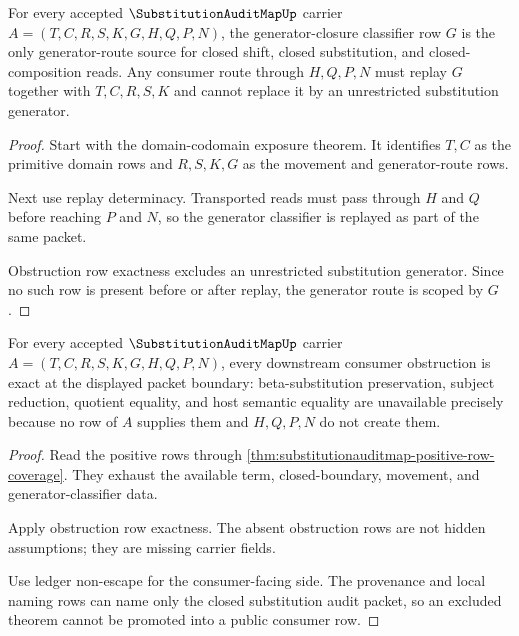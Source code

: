 \begin{theorem}
\label{thm:substitutionauditmap-generator-route-scope}
For every accepted $\SubstitutionAuditMapUp$ carrier $A=(T,C,R,S,K,G,H,Q,P,N)$, the generator-closure classifier row $G$ is the only generator-route source for closed shift, closed substitution, and closed-composition reads. Any consumer route through $H,Q,P,N$ must replay $G$ together with $T,C,R,S,K$ and cannot replace it by an unrestricted substitution generator.
\end{theorem}
\begin{proof}
Start with the domain-codomain exposure theorem. It identifies $T,C$ as the primitive domain rows and $R,S,K,G$ as the movement and generator-route rows.

Next use replay determinacy. Transported reads must pass through $H$ and $Q$ before reaching $P$ and $N$, so the generator classifier is replayed as part of the same packet.

Obstruction row exactness excludes an unrestricted substitution generator. Since no such row is present before or after replay, the generator route is scoped by $G$.
\end{proof}

\begin{theorem}
\label{thm:substitutionauditmap-consumer-obstruction-scope}
For every accepted $\SubstitutionAuditMapUp$ carrier $A=(T,C,R,S,K,G,H,Q,P,N)$, every downstream consumer obstruction is exact at the displayed packet boundary: beta-substitution preservation, subject reduction, quotient equality, and host semantic equality are unavailable precisely because no row of $A$ supplies them and $H,Q,P,N$ do not create them.
\end{theorem}
\begin{proof}
Read the positive rows through \autoref{thm:substitutionauditmap-positive-row-coverage}. They exhaust the available term, closed-boundary, movement, and generator-classifier data.

Apply obstruction row exactness. The absent obstruction rows are not hidden assumptions; they are missing carrier fields.

Use ledger non-escape for the consumer-facing side. The provenance and local naming rows can name only the closed substitution audit packet, so an excluded theorem cannot be promoted into a public consumer row.
\end{proof}

